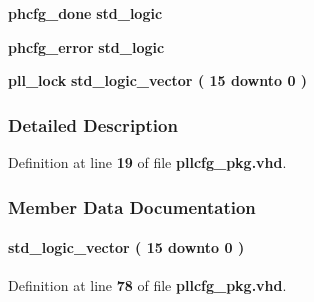 \begin{DoxyCompactItemize}
\item 
{\bf phcfg\+\_\+done} {\bfseries {\bfseries \textcolor{comment}{std\+\_\+logic}\textcolor{vhdlchar}{ }}} 
\item 
{\bf phcfg\+\_\+error} {\bfseries {\bfseries \textcolor{comment}{std\+\_\+logic}\textcolor{vhdlchar}{ }}} 
\item 
{\bf pll\+\_\+lock} {\bfseries {\bfseries \textcolor{comment}{std\+\_\+logic\+\_\+vector}\textcolor{vhdlchar}{ }\textcolor{vhdlchar}{(}\textcolor{vhdlchar}{ }\textcolor{vhdlchar}{ } \textcolor{vhdldigit}{15} \textcolor{vhdlchar}{ }\textcolor{keywordflow}{downto}\textcolor{vhdlchar}{ }\textcolor{vhdlchar}{ } \textcolor{vhdldigit}{0} \textcolor{vhdlchar}{ }\textcolor{vhdlchar}{)}\textcolor{vhdlchar}{ }}} 
\end{DoxyCompactItemize}


\subsubsection{Detailed Description}


Definition at line {\bf 19} of file {\bf pllcfg\+\_\+pkg.\+vhd}.



\subsubsection{Member Data Documentation}
\paragraph[{auto\+\_\+phcfg\+\_\+smpls}]{ {\bfseries \textcolor{comment}{std\+\_\+logic\+\_\+vector}\textcolor{vhdlchar}{ }\textcolor{vhdlchar}{(}\textcolor{vhdlchar}{ }\textcolor{vhdlchar}{ } \textcolor{vhdldigit}{15} \textcolor{vhdlchar}{ }\textcolor{keywordflow}{downto}\textcolor{vhdlchar}{ }\textcolor{vhdlchar}{ } \textcolor{vhdldigit}{0} \textcolor{vhdlchar}{ }\textcolor{vhdlchar}{)}\textcolor{vhdlchar}{ }} \hspace{0.3cm}{\ttfamily [Record]}}\label{classpllcfg__pkg_a80bf5846f7db82cae2f5e3d2f4f0195d}


Definition at line {\bf 78} of file {\bf pllcfg\+\_\+pkg.\+vhd}.

